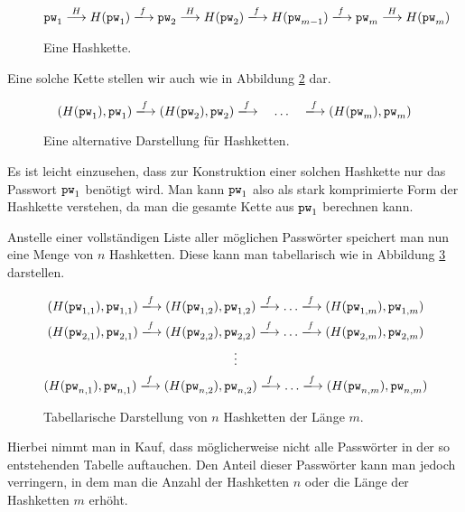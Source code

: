 \newcommand{\RTF}[1][]{\mathit{f}\if!#1!\else_{#1}\fi}
\newcommand{\VRTF}[1][]{\xlongrightarrow{\RTF[#1]}}
\newcommand{\hasharrow}{\stackrel{H}{\longrightarrow}}
\begin{figure}[h]
	\begin{equation*} \pw_1 \hasharrow H(\pw_1) \VRTF \pw_2
\hasharrow H(\pw_2) \VRTF %
H(\pw_{m-1}) \VRTF \pw_m \hasharrow H(\pw_m)
	\end{equation*}
	\caption{Eine Hashkette.}
	\label{fig:auth:hashchain}
\end{figure}

Eine solche Kette stellen wir auch wie in Abbildung
\ref{fig:auth:hashchainalternative} dar.

\begin{figure}[h]
	\begin{equation*} (H(\pw_{1}),\pw_{1}) \VRTF
(H(\pw_{2}),\pw_{2}) \VRTF\quad \ldots \quad \VRTF (H(\pw_{m}),\pw_{m})
	\end{equation*}
	\caption{Eine alternative Darstellung für Hashketten.}
	\label{fig:auth:hashchainalternative}
\end{figure}

Es ist leicht einzusehen, dass zur Konstruktion einer solchen Hashkette
nur das Passwort $\texttt{pw}_1$ benötigt wird. Man kann $\texttt{pw}_1$ also als stark
komprimierte Form der Hashkette verstehen, da man die gesamte Kette aus
$\texttt{pw}_1$ berechnen kann.

Anstelle einer vollständigen Liste aller möglichen Passwörter speichert
man nun eine Menge von $n$ Hashketten. Diese kann man tabellarisch wie
in Abbildung \ref{fig:auth:hashchains} darstellen.

\begin{figure}[h]
	\begin{gather*} (H(\pw_{1,1}),\pw_{1,1}) \VRTF
(H(\pw_{1,2}),\pw_{1,2}) \VRTF\ldots\VRTF (H(\pw_{1,m}),\pw_{1,m})\\
(H(\pw_{2,1}),\pw_{2,1}) \VRTF (H(\pw_{2,2}),\pw_{2,2}) \VRTF\ldots\VRTF
(H(\pw_{2,m}),\pw_{2,m})\\ \vdots\\ (H(\pw_{n,1}),\pw_{n,1}) \VRTF
(H(\pw_{n,2}),\pw_{n,2}) \VRTF\ldots\VRTF (H(\pw_{n,m}),\pw_{n,m})
	\end{gather*}
	\caption{Tabellarische Darstellung von $n$ Hashketten der Länge
$m$.}
	\label{fig:auth:hashchains}
\end{figure}

Hierbei nimmt man in Kauf, dass möglicherweise nicht alle Passwörter in
der so entstehenden Tabelle auftauchen. Den Anteil dieser Passwörter
kann man jedoch verringern, in dem man die Anzahl der Hashketten $n$
oder die Länge der Hashketten $m$ erhöht.

